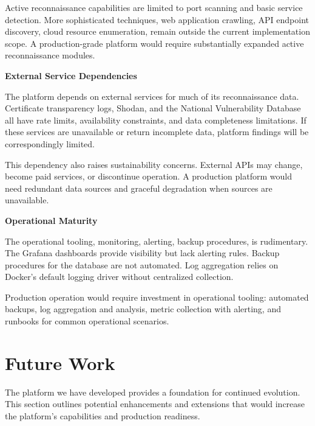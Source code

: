 \documentclass[a4paper,12pt]{report}
\begin{document}
Active reconnaissance capabilities are limited to port scanning and basic service detection. More sophisticated techniques, web application crawling, API endpoint discovery, cloud resource enumeration, remain outside the current implementation scope. A production-grade platform would require substantially expanded active reconnaissance modules.\hfill \break

\textbf{External Service Dependencies}\hfill \break

The platform depends on external services for much of its reconnaissance data. Certificate transparency logs, Shodan, and the National Vulnerability Database all have rate limits, availability constraints, and data completeness limitations. If these services are unavailable or return incomplete data, platform findings will be correspondingly limited.\hfill \break

This dependency also raises sustainability concerns. External APIs may change, become paid services, or discontinue operation. A production platform would need redundant data sources and graceful degradation when sources are unavailable.\hfill \break


\textbf{Operational Maturity}\hfill \break

The operational tooling, monitoring, alerting, backup procedures, is rudimentary. The Grafana dashboards provide visibility but lack alerting rules. Backup procedures for the database are not automated. Log aggregation relies on Docker's default logging driver without centralized collection.\hfill \break

Production operation would require investment in operational tooling: automated backups, log aggregation and analysis, metric collection with alerting, and runbooks for common operational scenarios.\hfill \break


\newpage
\thispagestyle{plain}
\section*{Future Work}
\label{chapter:Future Work}

The platform we have developed provides a foundation for continued evolution. This section outlines potential enhancements and extensions that would increase the platform's capabilities and production readiness.\hfill \break
\end{document}

